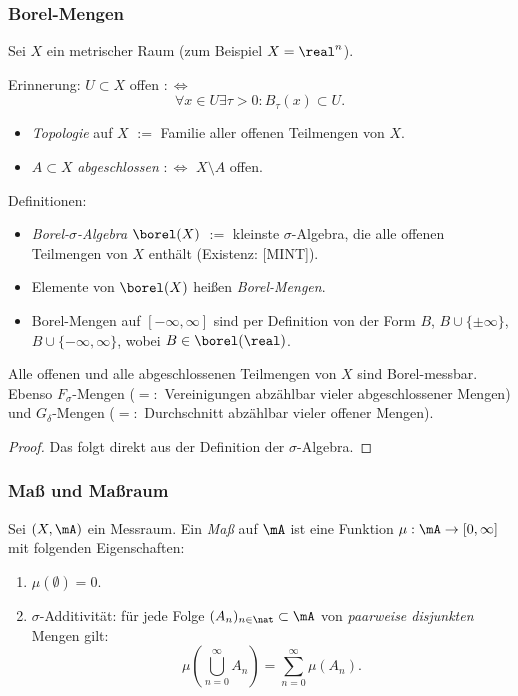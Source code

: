 \subsubsection{Borel-Mengen}
Sei $X$ ein metrischer Raum (zum Beispiel $X = \real^n$). 

Erinnerung: $U \subset X$ offen $:\Leftrightarrow$
\[ \forall x \in U \exists \tau > 0: B_\tau(x) \subset U. \]
\begin{itemize}
 \item \emph{Topologie} auf $X$ $:=$ Familie aller offenen Teilmengen von $X$.
 \item $A \subset X$ \emph{abgeschlossen} $:\Leftrightarrow$ $X \setminus A$ offen.
\end{itemize}

Definitionen:
\begin{itemize}
 \item \emph{Borel-$\sigma$-Algebra} $\borel(X)$ $:=$ kleinste $\sigma$-Algebra, die alle offenen Teilmengen von $X$ enthält (Existenz: [MINT]).
 \item Elemente von $\borel(X)$ heißen \emph{Borel-Mengen}.
 \item Borel-Mengen auf $[-\infty,\infty]$ sind per Definition von der Form $B$, $B \cup \{ \pm \infty \}$, $B \cup \{ -\infty, \infty \}$, wobei $B \in \borel(\real)$.
\end{itemize}

\begin{rmrk}
 Alle offenen und alle abgeschlossenen Teilmengen von $X$ sind Borel-mess\-bar. Ebenso $F_\sigma$-Mengen ($=:$ Vereinigungen abzählbar vieler abgeschlossener Mengen) und $G_\delta$-Mengen ($=:$ Durchschnitt abzählbar vieler offener Mengen).
\end{rmrk}

\begin{proof}
 Das folgt direkt aus der Definition der $\sigma$-Algebra.
\end{proof}

\subsubsection{Maß und Maßraum}
Sei $(X,\mA)$ ein Messraum. Ein \emph{Maß} auf $\mA$ ist eine Funktion $\mu: \mA \to [0,\infty]$ mit folgenden Eigenschaften:
\begin{enumerate}
 \item $\mu(\emptyset)=0$.
 \item $\sigma$-Additivität: für jede Folge $(A_n)_{n \in \nat} \subset \mA$ von \emph{paarweise disjunkten} Mengen gilt:
 \[ \mu\left( \bigcup_{n=0}^\infty A_n \right) = \sum_{n=0}^\infty \mu(A_n). \]
\end{enumerate}

